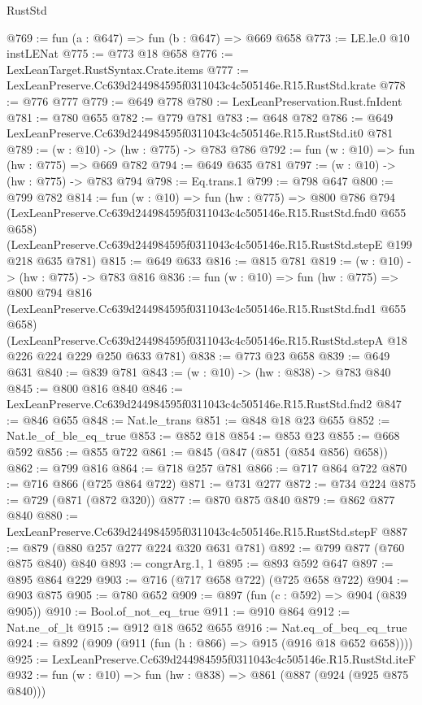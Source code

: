 \begin{lexlean}{RustStd}
\begin{coremodule}
@769 := fun (a : @647) => fun (b : @647) => @669 @658
@773 := LE.le.{0} @10 instLENat
@775 := @773 @18 @658
@776 := LexLeanTarget.RustSyntax.Crate.items
@777 := LexLeanPreserve.Cc639d244984595f0311043c4c505146e.R15.RustStd.krate
@778 := @776 @777
@779 := @649 @778
@780 := LexLeanPreservation.Rust.fnIdent
@781 := @780 @655
@782 := @779 @781
@783 := @648 @782
@786 := @649 LexLeanPreserve.Cc639d244984595f0311043c4c505146e.R15.RustStd.it0 @781
@789 := (w : @10) -> (hw : @775) -> @783 @786
@792 := fun (w : @10) => fun (hw : @775) => @669 @782
@794 := @649 @635 @781
@797 := (w : @10) -> (hw : @775) -> @783 @794
@798 := Eq.trans.{1}
@799 := @798 @647
@800 := @799 @782
@814 := fun (w : @10) =>
  fun (hw : @775) =>
  @800
    @786
    @794
    (LexLeanPreserve.Cc639d244984595f0311043c4c505146e.R15.RustStd.fnd0 @655 @658)
    (LexLeanPreserve.Cc639d244984595f0311043c4c505146e.R15.RustStd.stepE @199 @218 @635 @781)
@815 := @649 @633
@816 := @815 @781
@819 := (w : @10) -> (hw : @775) -> @783 @816
@836 := fun (w : @10) =>
  fun (hw : @775) =>
  @800
    @794
    @816
    (LexLeanPreserve.Cc639d244984595f0311043c4c505146e.R15.RustStd.fnd1 @655 @658)
    (LexLeanPreserve.Cc639d244984595f0311043c4c505146e.R15.RustStd.stepA
      @18
      @226
      @224
      @229
      @250
      @633
      @781)
@838 := @773 @23 @658
@839 := @649 @631
@840 := @839 @781
@843 := (w : @10) -> (hw : @838) -> @783 @840
@845 := @800 @816 @840
@846 := LexLeanPreserve.Cc639d244984595f0311043c4c505146e.R15.RustStd.fnd2
@847 := @846 @655
@848 := Nat.le_trans
@851 := @848 @18 @23 @655
@852 := Nat.le_of_ble_eq_true
@853 := @852 @18
@854 := @853 @23
@855 := @668 @592
@856 := @855 @722
@861 := @845 (@847 (@851 (@854 @856) @658))
@862 := @799 @816
@864 := @718 @257 @781
@866 := @717 @864 @722
@870 := @716 @866 (@725 @864 @722)
@871 := @731 @277
@872 := @734 @224
@875 := @729 (@871 (@872 @320))
@877 := @870 @875 @840
@879 := @862 @877 @840
@880 := LexLeanPreserve.Cc639d244984595f0311043c4c505146e.R15.RustStd.stepF
@887 := @879 (@880 @257 @277 @224 @320 @631 @781)
@892 := @799 @877 (@760 @875 @840) @840
@893 := congrArg.{1, 1}
@895 := @893 @592 @647
@897 := @895 @864 @229
@903 := @716 (@717 @658 @722) (@725 @658 @722)
@904 := @903 @875
@905 := @780 @652
@909 := @897 (fun (c : @592) => @904 (@839 @905))
@910 := Bool.of_not_eq_true
@911 := @910 @864
@912 := Nat.ne_of_lt
@915 := @912 @18 @652 @655
@916 := Nat.eq_of_beq_eq_true
@924 := @892 (@909 (@911 (fun (h : @866) => @915 (@916 @18 @652 @658))))
@925 := LexLeanPreserve.Cc639d244984595f0311043c4c505146e.R15.RustStd.iteF
@932 := fun (w : @10) => fun (hw : @838) => @861 (@887 (@924 (@925 @875 @840)))

\end{coremodule}
\end{lexlean}
